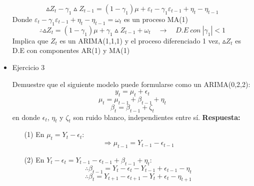 \documentclass[12pt,letterpaper]{article}
\begin{document}
\begin{itemize}
\begin{equation*}
        \vartriangle Z_{t}-\gamma_{1}\vartriangle Z_{t-1}=(1-\gamma_{1})\mu+\varepsilon_{t}-\gamma_{1}\varepsilon_{t-1}+\eta_{t}-\eta_{t-1}
    \end{equation*}
    Donde $\varepsilon_{t}-\gamma_{1}\varepsilon_{t-1}+\eta_{t}-\eta_{t-1}=\omega_{t}$ es un proceso MA(1)
    \begin{equation*}
        \therefore \vartriangle Z_{t}=(1-\gamma_{1})\mu +\gamma_{1}\vartriangle Z_{t-1}+\omega_{t}\quad\rightarrow\quad D.E~con~|\gamma_{1}|<1
    \end{equation*}
    Implica que $Z_{t}$ es un ARIMA(1,1,1) y el proceso diferenciado 1 vez, $\vartriangle Z_{t}$ es D.E con componentes AR(1) y MA(1)
    \newpage
 
\item Ejercicio 3

    Demuestre que el siguiente modelo puede formularse como un ARIMA(0,2,2):
    \begin{equation}
        y_t = \mu_t+\epsilon_t
    \end{equation}
    \begin{equation}
        \mu_t = \mu_{t-1}+\beta_{t-1}+\eta_t
    \end{equation}
    \begin{equation}
        \beta_t = \beta_{t-1}+\zeta_t
    \end{equation}
    en donde $\epsilon_t$, $\eta_t$ y $\zeta_t$ son ruido blanco, independientes entre sí.
    \newline
    \textbf{Respuesta:}
    \begin{itemize}
        \item[(1)] En $\mu_t = Y_t-\epsilon_t$: 
        \begin{equation*}
            \Rightarrow \mu_{t-1} = Y_{t-1}-\epsilon_{t-1}
        \end{equation*}
        
        \item[(2)] En $Y_t - \epsilon_t = Y_{t-1}-\epsilon_{t-1}+\beta_{t-1}+\eta_{t}$:
        \begin{equation*}
            \therefore \beta_{t-1} = Y_t-\epsilon_t-Y_{t-1}+\epsilon_{t-1}-\eta_{t}
        \end{equation*}
        \begin{equation*}
            \therefore \beta_t = Y_{t+1}-\epsilon_{t+1}-Y_t+\epsilon_t-\eta_{t+1}
        \end{equation*}
       

\end{itemize}
\end{itemize}
\end{document}
